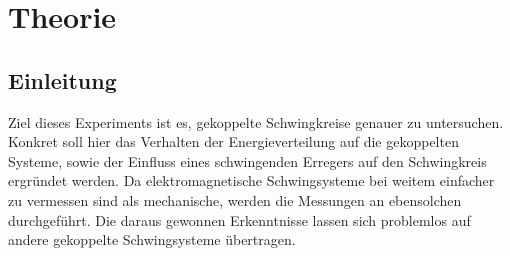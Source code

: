 \section{Theorie}
\label{sec:Theorie}

\subsection{Einleitung}
Ziel dieses Experiments ist es, gekoppelte Schwingkreise genauer zu untersuchen. 
Konkret soll hier das Verhalten der Energieverteilung auf die gekoppelten Systeme, sowie der Einfluss eines schwingenden 
Erregers auf den Schwingkreis ergründet werden.
Da elektromagnetische Schwingsysteme bei weitem einfacher zu vermessen sind als mechanische, werden die 
Messungen an ebensolchen durchgeführt. 
Die daraus gewonnen Erkenntnisse lassen sich problemlos auf andere gekoppelte Schwingsysteme übertragen. 


